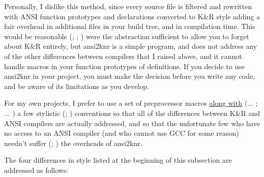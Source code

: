 Personally, I dislike this method, since every source file is filtered and 
rewritten with ANSI function prototypes and declarations converted to K\&R 
style adding a fair overhead in additional files in your build tree,
and in compilation time. This would be reasonable ({\MaQ{}}, {\MbQ{}}; {\MjQ{}})
were the abstraction sufficient to allow you to forget about K\&R entirely,
but ansi2knr is a simple program, and does not address any of the other
differences between compilers that I raised above, and it cannot handle macros 
in your function prototypes of definitions. If you decide to use ansi2knr in 
your project, you must make the decision before you write any code, and be 
aware of its limitations as you develop. 


For my own projects, I prefer to use a set of preprocessor macros 
\underline{along with} ({\McQ{}}... {\MaQ{}}; {\MaQ{}}... {\MaQ{}}) a few stylistic
({\MrQ{}}; {\MbQ{}}) conventions so that all of the differences 
between K\&R and ANSI compilers are actually addressed, and so that the 
unfortunate few who have no access to an ANSI compiler (and who cannot 
use GCC for some reason) needn't suffer ({\MjQ{}}; {\McQ{}}) the overheads of ansi2knr. 


The four differences in style listed at the beginning of this subsection 
are addressed as follows: 

